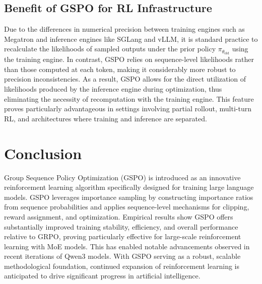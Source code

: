 \subsection{Benefit of GSPO for RL Infrastructure}

Due to the differences in numerical precision between training engines such as Megatron and inference engines like SGLang and vLLM, it is standard practice to recalculate the likelihoods of sampled outputs under the prior policy $\pi_{\theta_\text{old}}$ using the training engine. In contrast, GSPO relies on sequence-level likelihoods rather than those computed at each token, making it considerably more robust to precision inconsistencies. As a result, GSPO allows for the direct utilization of likelihoods produced by the inference engine during optimization, thus eliminating the necessity of recomputation with the training engine. This feature proves particularly advantageous in settings involving partial rollout, multi-turn RL, and architectures where training and inference are separated.

\section{Conclusion}

Group Sequence Policy Optimization (GSPO) is introduced as an innovative reinforcement learning algorithm specifically designed for training large language models. GSPO leverages importance sampling by constructing importance ratios from sequence probabilities and applies sequence-level mechanisms for clipping, reward assignment, and optimization. Empirical results show GSPO offers substantially improved training stability, efficiency, and overall performance relative to GRPO, proving particularly effective for large-scale reinforcement learning with MoE models. This has enabled notable advancements observed in recent iterations of Qwen3 models. With GSPO serving as a robust, scalable methodological foundation, continued expansion of reinforcement learning is anticipated to drive significant progress in artificial intelligence.

